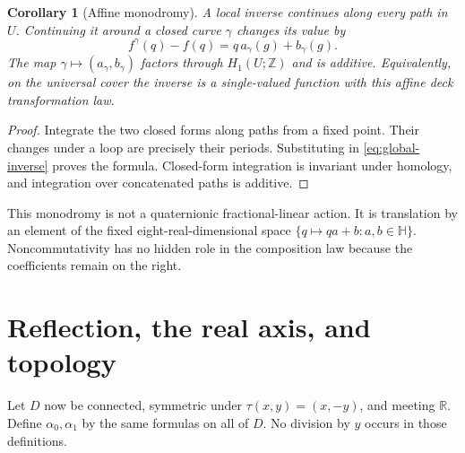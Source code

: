 \documentclass[11pt,a4paper]{article}
\numberwithin{equation}{section}
\newtheorem{corollary}[theorem]{Corollary}
\theoremstyle{definition}
\theoremstyle{remark}
\newcommand{\R}{\mathbb R}
\newcommand{\HH}{\mathbb H}
\begin{document}
\begin{corollary}[Affine monodromy]\label{cor:monodromy}
A local inverse continues along every path in $U$. Continuing it around a
closed curve $\gamma$ changes its value by
\begin{equation}\label{eq:monodromy}
 f^\gamma(q)-f(q)=q\,a_\gamma(g)+b_\gamma(g).
\end{equation}
The map $\gamma\mapsto(a_\gamma,b_\gamma)$ factors through
$H_1(U;\mathbb Z)$ and is additive. Equivalently, on the universal cover the
inverse is a single-valued function with this affine deck transformation law.
\end{corollary}
\begin{proof}
Integrate the two closed forms along paths from a fixed point. Their changes
under a loop are precisely their periods. Substituting in
\eqref{eq:global-inverse} proves the formula. Closed-form integration is
invariant under homology, and integration over concatenated paths is additive.
\end{proof}

This monodromy is not a quaternionic fractional-linear action. It is translation
by an element of the fixed eight-real-dimensional space
$\{q\mapsto qa+b:a,b\in\HH\}$. Noncommutativity has no hidden role in the
composition law because the coefficients remain on the right.

\section{Reflection, the real axis, and topology}
\label{sec:reflection}

Let $D$ now be connected, symmetric under
$\tau(x,y)=(x,-y)$, and meeting $\R$. Define $\alpha_0,\alpha_1$ by the same
formulas on all of $D$. No division by $y$ occurs in those definitions.
\end{document}
